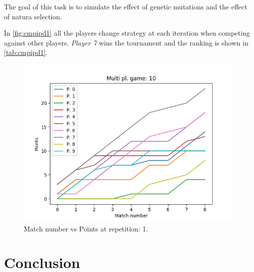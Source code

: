 \documentclass[journal,a4paper,10pt,twoside]{IEEEtran}
\begin{document}
The goal of this task is to simulate the effect of genetic mutations and the effect of natura selection.

In \autoref{fig:cmpipd1} all the players change strategy at each iteration when competing against other players. \textit{Player 7} wins the tournament and the ranking is shown in \autoref{tab:cmpipd1}.


\begin{figure}
    \centering
    \includegraphics[width=1\columnwidth]{../img_v1/cidpmp-scores-10.png}
    \caption{Match number vs Points at repetition: 1.}
    \label{fig:cmpipd1}
\end{figure}



\section{Conclusion} \label{Conclusion}

%
%
\end{document}
